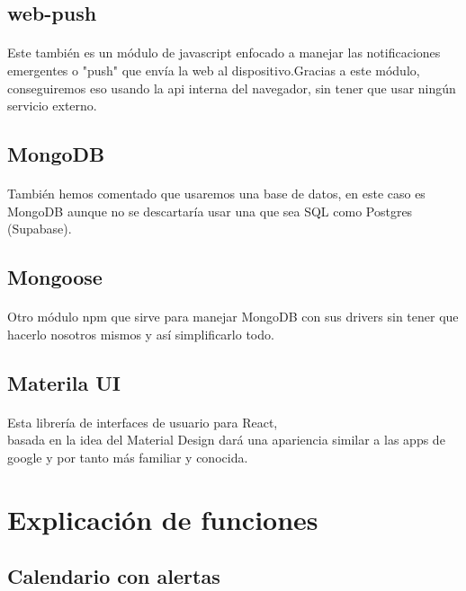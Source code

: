 \documentclass[a4paper]{article}
\begin{document}
\subsection[Web-Push]{web-push}
\paragraph{}
Este también es un módulo de javascript enfocado a manejar las notificaciones emergentes o "push"
que envía la web al dispositivo.Gracias a este módulo, conseguiremos eso usando la api interna del
navegador, sin tener que usar ningún servicio externo.
\subsection[MongoDB]{MongoDB}
\paragraph{}
También hemos comentado que usaremos una base de datos, en este caso es MongoDB aunque
no se descartaría usar una que sea SQL como Postgres (Supabase).
\subsection[Mongoose]{Mongoose}
\paragraph{}
Otro módulo npm que sirve para manejar MongoDB con sus drivers sin tener que hacerlo
nosotros mismos y así simplificarlo todo.
\subsection[MUI]{Materila UI}
\paragraph{}
Esta librería de interfaces de usuario para React,\\ basada en la idea del Material Design
dará una apariencia similar a las apps de google y por tanto más familiar y conocida.
\section[Explicación de funciones]{Explicación de funciones}
\subsection[Calendario]{Calendario con alertas}
\end{document}
